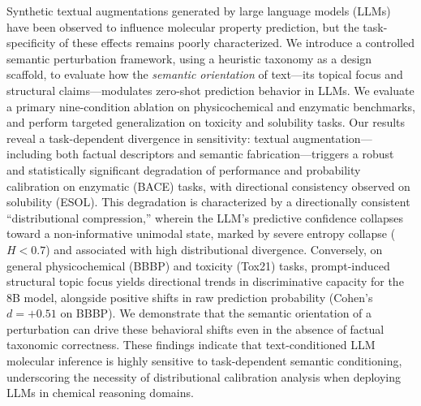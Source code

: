 Synthetic textual augmentations generated by large language models (LLMs) have been observed to influence molecular property prediction, but the task-specificity of these effects remains poorly characterized. We introduce a controlled semantic perturbation framework, using a heuristic taxonomy as a design scaffold, to evaluate how the \textit{semantic orientation} of text---its topical focus and structural claims---modulates zero-shot prediction behavior in LLMs. We evaluate a primary nine-condition ablation on physicochemical and enzymatic benchmarks, and perform targeted generalization on toxicity and solubility tasks. Our results reveal a task-dependent divergence in sensitivity: textual augmentation---including both factual descriptors and semantic fabrication---triggers a robust and statistically significant degradation of performance and probability calibration on enzymatic (BACE) tasks, with directional consistency observed on solubility (ESOL). This degradation is characterized by a directionally consistent ``distributional compression,'' wherein the LLM's predictive confidence collapses toward a non-informative unimodal state, marked by severe entropy collapse ($H < 0.7$) and associated with high distributional divergence. Conversely, on general physicochemical (BBBP) and toxicity (Tox21) tasks, prompt-induced structural topic focus yields directional trends in discriminative capacity for the 8B model, alongside positive shifts in raw prediction probability (Cohen's $d = +0.51$ on BBBP). We demonstrate that the semantic orientation of a perturbation can drive these behavioral shifts even in the absence of factual taxonomic correctness. These findings indicate that text-conditioned LLM molecular inference is highly sensitive to task-dependent semantic conditioning, underscoring the necessity of distributional calibration analysis when deploying LLMs in chemical reasoning domains.
